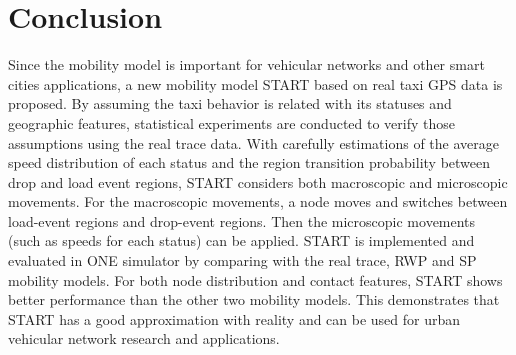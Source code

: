 \documentclass[10pt,journal,compsocconf,letterpaper]{IEEEtran}
\begin{document}






%



\section{Conclusion}
\label{section_conclusion}
Since the mobility model is important for vehicular networks and other smart cities applications, a new mobility model START based on real taxi GPS data is proposed. By assuming the taxi behavior is related with its statuses and geographic features, statistical experiments are conducted to verify those assumptions using the real trace data. With carefully estimations of the average speed distribution of each status and the region transition probability between drop and load event regions, START considers both macroscopic and microscopic movements. For the macroscopic movements, a node moves and switches between load-event regions and drop-event regions. Then the microscopic movements (such as speeds for each status) can be applied. START is implemented and evaluated in ONE simulator by comparing with the real trace, RWP and SP mobility models.
For both node distribution and contact features, START shows better performance than the other two mobility models. This demonstrates that START has a good approximation with reality and can be used for urban vehicular network research and applications.


%
%
\end{document}
